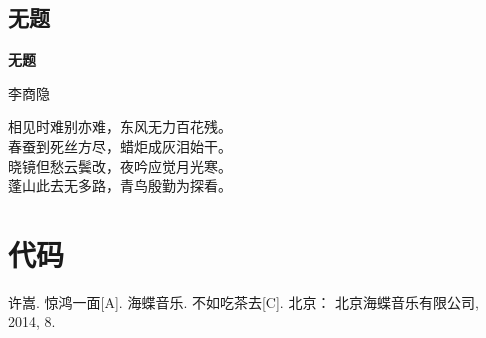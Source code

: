 \subsection{无题}
\begin{center}
\textbf{无题}

{\kaishu 李商隐}

\vspace*{1em}
相见时难别亦难，东风无力百花残。\\
春蚕到死丝方尽，蜡炬成灰泪始干。\\
晓镜但愁云鬓改，夜吟应觉月光寒。\\
蓬山此去无多路，青鸟殷勤为探看。
\end{center}

\section{代码}





\begin{thebibliography}{A1}
许嵩. 惊鸿一面[A]. 海蝶音乐. 不如吃茶去[C]. 北京： 北京海蝶音乐有限公司, 2014, 8.

\end{thebibliography}
